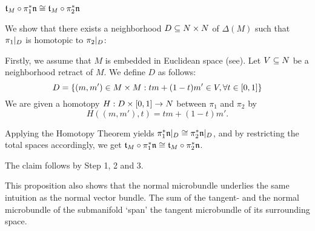 \begin{myproof}
\begin{steps}
        \item $\mathfrak{t}_M \circ \pi_1^*\mathfrak{n} \cong \mathfrak{t}_M \circ \pi_2^*\mathfrak{n}$
        
        We show that there exists a neighborhood $D \subseteq{} N \times N$ of $\Delta(M)$ such that
        $\pi_1\vert_{D}$ is homotopic to $\pi_2\vert_{D}$:

        Firstly, we assume that $M$ is embedded in Euclidean space (see\cite[p.60]{dimension}).
        Let $V \subseteq{} N$ be a neighborhood retract of $M$.
        We define $D$ as follows:
        \[ D = \{(m, m') \in M \times M: tm + (1 - t)m' \in V, \forall t \in [0, 1]\} \]
        We are given a homotopy $H: D \times{} [0, 1] \to N$ between $\pi_1$ and $\pi_2$ by
        \[ H((m, m'), t) = tm + (1 - t)m'. \]

        Applying the Homotopy Theorem yields $\pi_1^*\mathfrak{n}\vert_{D} \cong \pi_2^*\mathfrak{n}\vert_{D}$, and
        by restricting the total spaces accordingly, we get
        $\mathfrak{t}_M \circ \pi_1^*\mathfrak{n} \cong \mathfrak{t}_M \circ \pi_2^*\mathfrak{n}$.
    \end{steps}
    The claim follows by Step 1, 2 and 3.
\end{myproof}

\begin{myparagraph}
    This proposition also shows that the normal microbundle
    underlies the same intuition as the normal vector bundle.
    The sum of the tangent- and the normal microbundle of the submanifold
    `span' the tangent microbundle of its surrounding space.
\end{myparagraph}